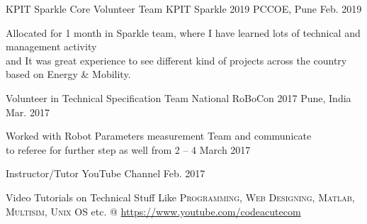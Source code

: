 
\vspace{-10pt}
\vspace{-8pt}

\begin{cventries}


\cventry
{KPIT Sparkle Core Volunteer Team} %
{KPIT Sparkle 2019} %
{PCCOE, Pune} %
{Feb. 2019} %
{ %
	\begin{cvitems}
		\item {Allocated for 1 month in Sparkle team, where I have learned lots of technical and management activity\\ and It was great experience to see different kind of projects across the country based on Energy \& Mobility.}
	\end{cvitems}
}

\vspace{-14pt}

\cventry
{Volunteer in Technical Specification Team} %
{National RoBoCon 2017} %
{Pune, India} %
{Mar. 2017} %
{ %
	\begin{cvitems}
		\item {Worked with Robot Parameters measurement Team and communicate\\ to referee for further step as well from 2 -- 4 March 2017}
	\end{cvitems}
}
\vspace{-14pt}


\cventry
{Instructor/Tutor} %
{YouTube Channel } %
{} %
{Feb. 2017} %
{ %
	\begin{cvitems}
		\item {Video Tutorials on Technical Stuff Like \textsc{Programming}, \textsc{Web Designing},
		\textsc{Matlab},\\ \textsc{Multisim}, \textsc{Unix OS} etc. @ \url{https://www.youtube.com/codeacutecom}}
	\end{cvitems}
}

\end{cventries}